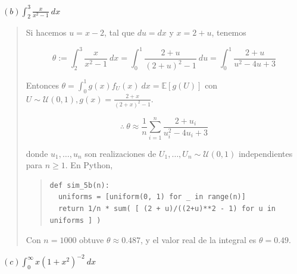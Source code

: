 \documentclass[a4paper, 12pt]{article}
\begin{document}
$(b) \int_2^3 \frac{x}{x^2-1} ~ dx$


\small
\begin{quote}

Si hacemos $u = x - 2$, tal que $du = dx$ y $x = 2 + u$, tenemos 

\begin{equation*}
  \theta := \int_2^3 \frac{x}{x^2 - 1} ~ dx = \int_0^1 \frac{2+u}{(2+u)^2 - 1} ~ du =
  \int_0^1 \frac{2+u}{u^2 - 4u + 3}
\end{equation*}

Entonces $\theta = \int_0^1 g(x)f_U(x) ~ dx = \mathbb{E}\left[ g(U) \right] $
con $U \sim \mathcal{U}(0, 1), g(x) = \frac{2+x}{(2+x)^2 - 1}$. 

\begin{equation*}
  \therefore ~ \theta \approx \frac{1}{n}\sum_{i=1}^n \frac{2 + u_i}{u_i^2
  -4u_i + 3}
\end{equation*}

donde $u_1, \ldots, u_n$ son realizaciones de $U_1, \ldots, U_n \sim
\mathcal{U}(0, 1)$ independientes para $n \geq 1$. En Python, 

\footnotesize
\begin{quote}
  
\begin{verbatim}
def sim_5b(n):
  uniforms = [uniform(0, 1) for _ in range(n)]
  return 1/n * sum( [ (2 + u)/((2+u)**2 - 1) for u in uniforms ] )
\end{verbatim}
\end{quote}
\small

Con $n = 1000$ obtuve $\theta \approx 0.487$, y el valor real de la integral es $\theta = 0.49$.

\end{quote}
\normalsize
\pagebreak

$(c) \int_0^\infty x(1+x^2)^{-2} ~ dx$
\end{document}
